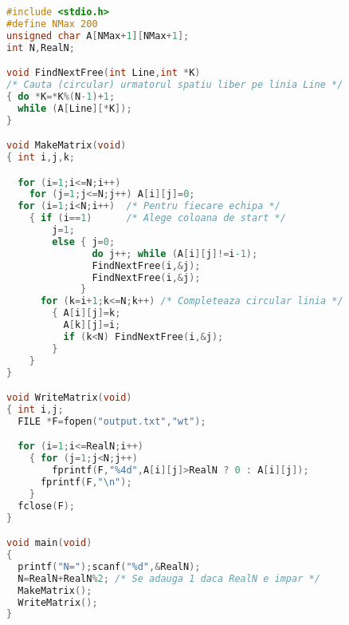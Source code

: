 \begin{lstlisting}[language=C]
#include <stdio.h>
#define NMax 200
unsigned char A[NMax+1][NMax+1];
int N,RealN;

void FindNextFree(int Line,int *K)
/* Cauta (circular) urmatorul spatiu liber pe linia Line */
{ do *K=*K%(N-1)+1;
  while (A[Line][*K]);
}

void MakeMatrix(void)
{ int i,j,k;

  for (i=1;i<=N;i++)
    for (j=1;j<=N;j++) A[i][j]=0;
  for (i=1;i<N;i++)  /* Pentru fiecare echipa */
    { if (i==1)      /* Alege coloana de start */
        j=1;
        else { j=0;
               do j++; while (A[i][j]!=i-1);
               FindNextFree(i,&j);
               FindNextFree(i,&j);
             }
      for (k=i+1;k<=N;k++) /* Completeaza circular linia */
        { A[i][j]=k;
          A[k][j]=i;
          if (k<N) FindNextFree(i,&j);
        }
    }
}

void WriteMatrix(void)
{ int i,j;
  FILE *F=fopen("output.txt","wt");

  for (i=1;i<=RealN;i++)
    { for (j=1;j<N;j++)
        fprintf(F,"%4d",A[i][j]>RealN ? 0 : A[i][j]);
      fprintf(F,"\n");
    }
  fclose(F);
}

void main(void)
{
  printf("N=");scanf("%d",&RealN);
  N=RealN+RealN%2; /* Se adauga 1 daca RealN e impar */
  MakeMatrix();
  WriteMatrix();
}
\end{lstlisting}
